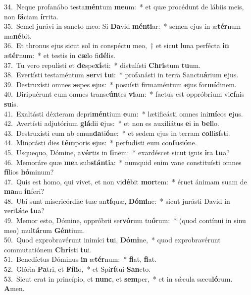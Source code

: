 {34.~}Neque profanábo testa\textbf{mén}tum \textbf{me}um:~* et quæ procédunt de lábiis meis, non \textbf{fá}ciam \textbf{ír}rita.\\
{35.~}Semel jurávi in sancto meo: Si \textbf{Da}vid \textbf{mén}\textbf{ti}ar:~* semen ejus in æ\textbf{tér}num ma\textbf{né}bit.\\
{36.~}Et thronus ejus sicut sol in conspéctu meo,~† et sicut luna perfécta \textbf{in} æ\textbf{tér}num:~* et testis in \textbf{cæ}lo fi\textbf{dé}lis.\\
{37.~}Tu vero repulísti et \textbf{de}spe\textbf{xí}sti:~* distulísti \textbf{Chri}stum \textbf{tu}um.\\
{38.~}Evertísti testaméntum \textbf{ser}vi \textbf{tu}i:~* profanásti in terra Sanctu\textbf{á}rium \textbf{e}jus.\\
{39.~}Destruxísti omnes \textbf{se}pes \textbf{e}jus:~* posuísti firmaméntum \textbf{e}jus for\textbf{mí}dinem.\\
{40.~}Diripuérunt eum omnes transe\textbf{ún}tes \textbf{vi}am:~* factus est oppróbrium vi\textbf{cí}nis \textbf{su}is.\\
{41.~}Exaltásti déxteram depri\textbf{mén}tium \textbf{e}um:~* lætificásti omnes ini\textbf{mí}cos \textbf{e}jus.\\
{42.~}Avertísti adjutórium \textbf{glá}dii \textbf{e}jus:~* et non es auxiliátus \textbf{e}i in \textbf{bel}lo.\\
{43.~}Destruxísti eum ab emun\textbf{da}ti\textbf{ó}ne:~* et sedem ejus in terram \textbf{col}li\textbf{sí}sti.\\
{44.~}Minorásti dies \textbf{tém}poris \textbf{e}jus:~* perfudísti eum con\textbf{fu}si\textbf{ó}ne.\\
{45.~}Usquequo, Dómine, a\textbf{vér}tis in \textbf{fi}nem:~* exardéscet sicut ignis \textbf{i}ra \textbf{tu}a?\\
{46.~}Memoráre quæ \textbf{me}a sub\textbf{stán}\textbf{ti}a:~* numquid enim vane constituísti omnes \textbf{fí}lios \textbf{hó}minum?\\
{47.~}Quis est homo, qui vivet, et non vi\textbf{dé}bit \textbf{mor}tem:~* éruet ánimam suam de \textbf{ma}nu \textbf{ín}feri?\\
{48.~}Ubi sunt misericórdiæ tuæ an\textbf{tí}quæ, \textbf{Dó}\textbf{mi}ne:~* sicut jurásti David in veri\textbf{tá}te \textbf{tu}a?\\
{49.~}Memor esto, Dómine, oppróbrii ser\textbf{vó}rum tu\textbf{ó}rum:~* (quod contínui in sinu meo) mul\textbf{tá}rum \textbf{Gén}tium.\\
{50.~}Quod exprobravérunt inimíci \textbf{tu}i, \textbf{Dó}\textbf{mi}ne,~* quod exprobravérunt commutatiónem \textbf{Chri}sti \textbf{tu}i.\\
{51.~}Benedíctus Dóminus \textbf{in} æ\textbf{tér}num:~* \textbf{fi}at, \textbf{fi}at.\\
{52.~}Glória \textbf{Pa}tri, et \textbf{Fí}\textbf{li}o,~* et Spi\textbf{rí}tui \textbf{San}cto.\\
{53.~}Sicut erat in princípio, et \textbf{nunc}, et \textbf{sem}per,~* et in sǽcula sæcu\textbf{ló}rum. \textbf{A}men.\\
